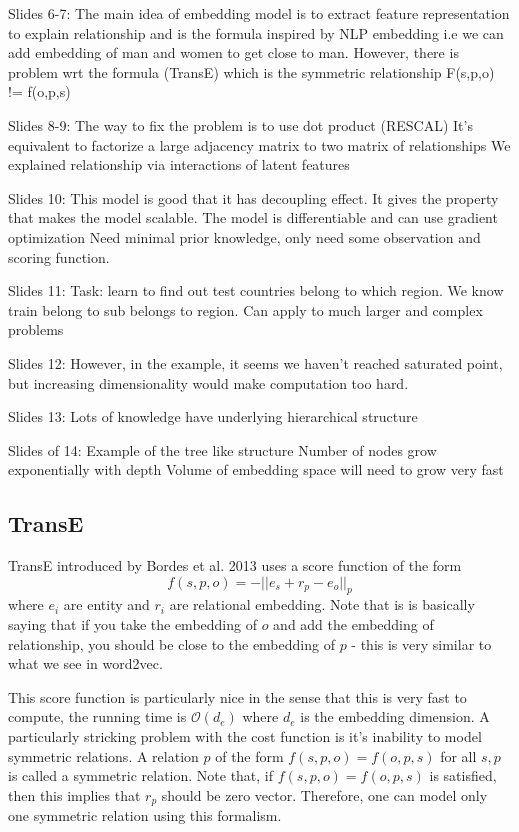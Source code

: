 Slides 6-7:
The main idea of embedding model is to extract feature representation to explain relationship and is the formula inspired by NLP embedding i.e we can add embedding of man and women to get close to man.
However, there is problem wrt the formula (TransE) which is the symmetric relationship
F(s,p,o) != f(o,p,s)

Slides 8-9:
The way to fix the problem is to use dot product (RESCAL)
It’s equivalent to factorize a large adjacency matrix to two matrix of relationships
We explained relationship via interactions of latent features

Slides 10:
This model is good that it has decoupling effect. It gives the property that makes the model scalable.
The model is differentiable and can use gradient optimization 
Need minimal prior knowledge, only need some observation and scoring function.

Slides 11:
Task: learn to find out test countries belong to which region.
We know train belong to sub belongs to region.
Can apply to much larger and complex problems

Slides 12:
However, in the example, it seems we haven’t reached saturated point, but increasing dimensionality would make computation too hard.

Slides 13:
Lots of knowledge have underlying hierarchical structure 

Slides of 14:
Example of the tree like structure
Number of nodes grow exponentially with depth
Volume of embedding space will need to grow very fast



\subsection{TransE}
TransE introduced by Bordes et al. 2013 uses a score function of the form $$ f(s, p, o) = -|| e_s + r_p - e_o ||_p $$ where $e_i$ are entity and $r_i$ are relational embedding. Note that is is basically saying that if you take the embedding of $o$ and add the embedding of relationship, you should be close to the embedding of $p$ - this is very similar to what we see in word2vec. 

This score function is particularly nice in the sense that this is very fast to compute, the running time is $\mathcal{O}(d_e)$ where $d_e$ is the embedding dimension. A particularly stricking problem with the cost function is it's inability to model symmetric relations. A relation $p$ of the form $f(s, p, o) = f(o, p, s)$ for all $s, p$ is called a symmetric relation. Note that, if $f(s, p, o) = f(o, p, s)$ is satisfied, then this implies that $r_p$ should be zero vector. Therefore, one can model only one symmetric relation using this formalism. 

